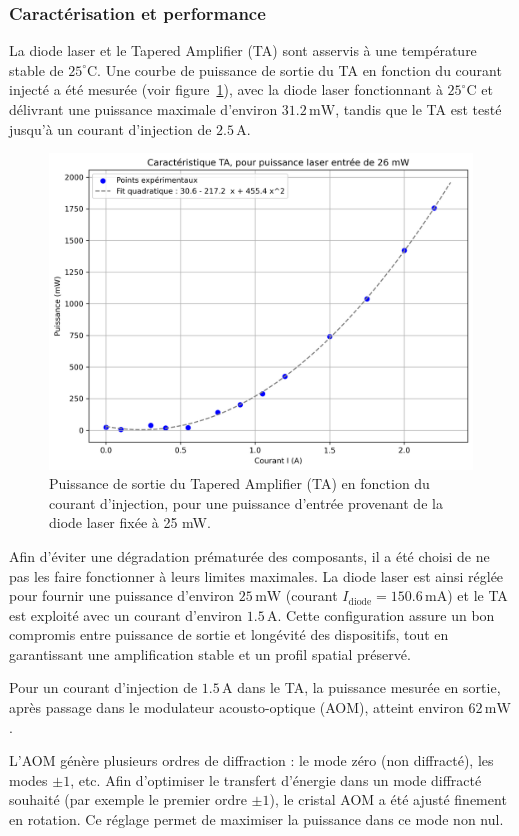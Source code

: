 \subsubsection*{Caractérisation et performance}

La diode laser et le Tapered Amplifier (TA) sont asservis à une température stable de $25^\circ$C. Une courbe de puissance de sortie du TA en fonction du courant injecté a été mesurée (voir figure~\ref{fig:Puissance_TA}), avec la diode laser fonctionnant à $25^\circ$C et délivrant une puissance maximale d’environ $31.2\,\text{mW}$, tandis que le TA est testé jusqu’à un courant d’injection de $2.5\,\text{A}$.

\begin{figure}[H]
    \centering
    \includegraphics[width=0.7\linewidth]{figures/07_Dipolaire/Puissance_TA.png}
    \caption{Puissance de sortie du Tapered Amplifier (TA) en fonction du courant d’injection, pour une puissance d’entrée provenant de la diode laser fixée à 25 mW.}
    \label{fig:Puissance_TA}
\end{figure}

Afin d’éviter une dégradation prématurée des composants, il a été choisi de ne pas les faire fonctionner à leurs limites maximales. La diode laser est ainsi réglée pour fournir une puissance d’environ $25\,\text{mW}$ (courant $I_{\text{diode}} = 150.6\,\text{mA}$) et le TA est exploité avec un courant d’environ $1.5\,\text{A}$. Cette configuration assure un bon compromis entre puissance de sortie et longévité des dispositifs, tout en garantissant une amplification stable et un profil spatial préservé.

Pour un courant d’injection de $1.5\,\text{A}$ dans le TA, la puissance mesurée en sortie, après passage dans le modulateur acousto-optique (AOM), atteint environ $62\,\text{mW}$. 

L’AOM génère plusieurs ordres de diffraction : le mode zéro (non diffracté), les modes $\pm 1$, etc. Afin d’optimiser le transfert d’énergie dans un mode diffracté souhaité (par exemple le premier ordre $\pm 1$), le cristal AOM a été ajusté finement en rotation. Ce réglage permet de maximiser la puissance dans ce mode non nul.

